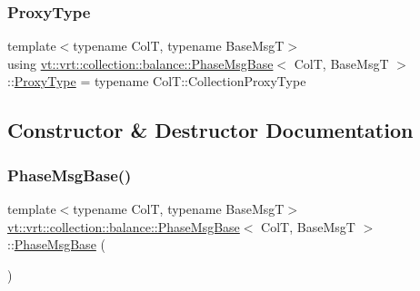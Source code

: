 \subsubsection{\texorpdfstring{Proxy\+Type}{ProxyType}}
{\footnotesize\ttfamily template$<$typename ColT, typename Base\+MsgT$>$ \\
using \hyperlink{structvt_1_1vrt_1_1collection_1_1balance_1_1_phase_msg_base}{vt\+::vrt\+::collection\+::balance\+::\+Phase\+Msg\+Base}$<$ ColT, Base\+MsgT $>$\+::\hyperlink{structvt_1_1vrt_1_1collection_1_1balance_1_1_phase_msg_base_a21c9d10c5a8d1386f4e0a1bfa04f482f}{Proxy\+Type} =  typename Col\+T\+::\+Collection\+Proxy\+Type}



\subsection{Constructor \& Destructor Documentation}
\mbox{\label{structvt_1_1vrt_1_1collection_1_1balance_1_1_phase_msg_base_a6dc4fc0633d31368deae1da80cdb9093}} 
\subsubsection{\texorpdfstring{Phase\+Msg\+Base()}{PhaseMsgBase()}\hspace{0.1cm}{\footnotesize\ttfamily [1/2]}}
{\footnotesize\ttfamily template$<$typename ColT, typename Base\+MsgT$>$ \\
\hyperlink{structvt_1_1vrt_1_1collection_1_1balance_1_1_phase_msg_base}{vt\+::vrt\+::collection\+::balance\+::\+Phase\+Msg\+Base}$<$ ColT, Base\+MsgT $>$\+::\hyperlink{structvt_1_1vrt_1_1collection_1_1balance_1_1_phase_msg_base}{Phase\+Msg\+Base} (\begin{DoxyParamCaption}{ }\end{DoxyParamCaption})\hspace{0.3cm}{\ttfamily [default]}}

\mbox{\label{structvt_1_1vrt_1_1collection_1_1balance_1_1_phase_msg_base_a10f04955c5a53a65fec9992a9fca8fde}} 

